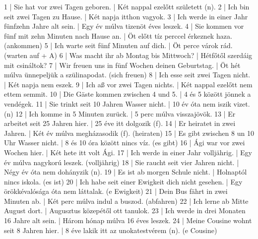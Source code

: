 \begin{exmp}
1 | Sie hat vor zwei Tagen geboren. | Két nappal ezelőtt született (n).
2 | Ich bin seit zwei Tagen zu Hause. | Két napja itthon vagyok.
3 | Ich werde in einer Jahr fünfzehn Jahre alt sein. | Egy év múlva tizenöt éves leszek.
4 | Sie kommen vor fünf mit zehn Minuten nach Hause an. | Öt előtt tíz perccel érkeznek haza. (ankommen)
5 | Ich warte seit fünf Minuten auf dich. | Öt perce várok rád. (warten auf + A)
6 | Was macht ihr ab Montag bis Mittwoch? | Hétfőtől szerdáig mit csináltok?
7 | Wir freuen uns in fünf Wochen deinen Geburtstag. | Öt hét múlva ünnepeljük a szülinapodat. (sich freuen)
8 | Ich esse seit zwei Tagen nicht. | Két napja nem eszek.
9 | Ich aß vor zwei Tagen nichts. | Két nappal ezelőtt nem ettem semmit.
10 | Die Gäste kommen zwischen 4 und 5. | 4 és 5 között jönnek a vendégek.
11 | Sie trinkt seit 10 Jahren Wasser nicht. | 10 év óta nem iszik vizet. (n)
12 | Ich komme in 5 Minuten zurück. | 5 perc múlva visszajövök.
13 | Er arbeitet seit 25 Jahren hier. | 25 éve itt dolgozik (f).
14 | Er heiratet in zwei Jahren. | Két év múlva megházasodik (f). (heiraten)
15 | Es gibt zwischen 8 un 10 Uhr Wasser nicht. | 8 és 10 óra között nincs víz. (es gibt)
16 | Ági war vor zwei Wochen hier. | Két hete itt volt Ági.
17 | Ich werde in einer Jahr volljährig. | Egy év múlva nagykorú leszek. (volljährig)
18 | Sie raucht seit vier Jahren nicht. | Négy év óta nem dohányzik (n).
19 | Es ist ab morgen Schule nicht. | Holnaptól nincs iskola. (es ist)
20 | Ich habe seit einer Ewigkeit dich nicht gesehen. | Egy örökkévalósága óta nem láttalak. (e Ewigkeit)
21 | Dein Bus fährt in zwei Minuten ab. | Két perc múlva indul a buszod. (abfahren)
22 | Ich lerne ab Mitte August dort. | Augusztus közepétől ott tanulok.
23 | Ich werde in drei Monaten 16 Jahre alt sein. | Három hónap múlva 16 éves leszek.
24 | Meine Cousine wohnt seit 8 Jahren hier. | 8 éve lakik itt az unokatestvérem (n). (e Cousine)
\end{exmp}

